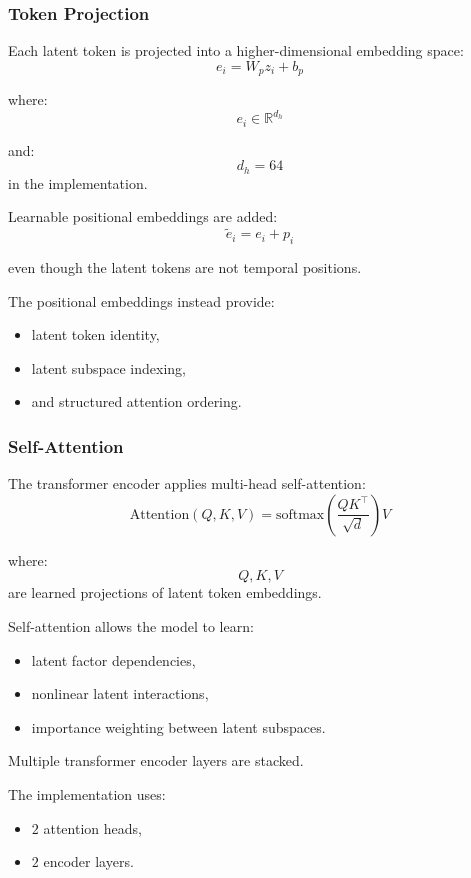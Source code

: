 \documentclass[11pt]{article}
\begin{document}
\subsubsection{Token Projection}

Each latent token is projected into a higher-dimensional embedding space:
\[
e_i
=
W_p z_i + b_p
\]

where:
\[
e_i
\in
\mathbb{R}^{d_h}
\]

and:
\[
d_h = 64
\]
in the implementation.

Learnable positional embeddings are added:
\[
\tilde e_i
=
e_i + p_i
\]

even though the latent tokens are not temporal positions.

The positional embeddings instead provide:
\begin{itemize}
    \item latent token identity,
    \item latent subspace indexing,
    \item and structured attention ordering.
\end{itemize}

\subsubsection{Self-Attention}

The transformer encoder applies multi-head self-attention:
\[
\text{Attention}(Q,K,V)
=
\text{softmax}
\left(
\frac{QK^\top}{\sqrt d}
\right)V
\]

where:
\[
Q,K,V
\]
are learned projections of latent token embeddings.

Self-attention allows the model to learn:
\begin{itemize}
    \item latent factor dependencies,
    \item nonlinear latent interactions,
    \item importance weighting between latent subspaces.
\end{itemize}

Multiple transformer encoder layers are stacked.

The implementation uses:
\begin{itemize}
    \item \(2\) attention heads,
    \item \(2\) encoder layers.
\end{itemize}
\end{document}

